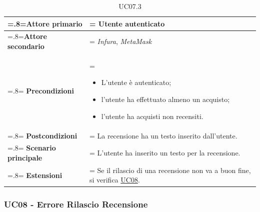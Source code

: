                 \begin{table}[H]
                    \centering
                    \renewcommand{\arraystretch}{1.8}
                    \renewcommand\tabularxcolumn[1]{m{#1}}
                    \begin{tabularx}{0.9\textwidth}{
                        >{\hsize=.8\hsize\linewidth=\hsize}X
                        >{\hsize=1.2\hsize\linewidth=\hsize}X}
                        \hline
                        \textbf{Attore primario} & Utente autenticato \\
                        \hline
                        \textbf{Attore secondario} & \textit{Infura}, \textit{MetaMask} \\
                        \hline
                        \textbf{Precondizioni} &
                            \begin{itemize}
                                \item L'utente è autenticato;
                                \item l'utente ha effettuato almeno un acquisto;
                                \item l'utente ha acquisti non recensiti.
                            \end{itemize} \\
                        \hline
                        \textbf{Postcondizioni} & La recensione ha un testo inserito dall'utente. \\
                        \hline
                        \textbf{Scenario principale} &
                        L'utente ha inserito un testo per la recensione. \\
                        \hline
                        \textbf{Estensioni} & Se il rilascio di una recensione non va a buon fine, si verifica \hyperref[UC08]{UC08}. \\
                        \hline
                    \end{tabularx}
                    \caption{UC07.3}
                \end{table}

        \subsubsection{UC08 - Errore Rilascio Recensione}
        \label{UC08}

